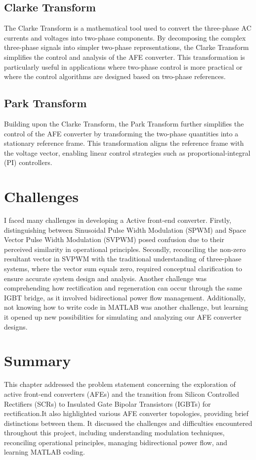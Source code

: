 \subsection{Clarke Transform}
The Clarke Transform is a mathematical tool used to convert the three-phase AC
currents and voltages into two-phase components. By decomposing the complex
three-phase signals into simpler two-phase representations, the Clarke
Transform simplifies the control and analysis of the AFE converter. This
transformation is particularly useful in applications where two-phase control
is more practical or where the control algorithms are designed based on
two-phase references.

\subsection{Park Transform}
Building upon the Clarke Transform, the Park Transform further simplifies the
control of the AFE converter by transforming the two-phase quantities into a
stationary reference frame. This transformation aligns the reference frame with
the voltage vector, enabling linear control strategies such as
proportional-integral (PI) controllers.

\section{Challenges}
I faced many challenges in developing a Active front-end converter. Firstly,
distinguishing between Sinusoidal Pulse Width Modulation (SPWM) and Space
Vector Pulse Width Modulation (SVPWM) posed confusion due to their perceived
similarity in operational principles. Secondly, reconciling the non-zero
resultant vector in SVPWM with the traditional understanding of three-phase
systems, where the vector sum equals zero, required conceptual clarification to
ensure accurate system design and analysis. Another challenge was comprehending
how rectification and regeneration can occur through the same IGBT bridge, as
it involved bidirectional power flow management. Additionally, not knowing how
to write code in MATLAB was another challenge, but learning it opened up new
possibilities for simulating and analyzing our AFE converter designs.

\section{Summary}
This chapter addressed the problem statement concerning the exploration of
active front-end converters (AFEs) and the transition from Silicon Controlled
Rectifiers (SCRs) to Insulated Gate Bipolar Transistors (IGBTs) for
rectification.It also highlighted various AFE converter topologies, providing
brief distinctions between them. It discussed the challenges and difficulties
encountered throughout this project, including understanding modulation
techniques, reconciling operational principles, managing bidirectional power
flow, and learning MATLAB coding.